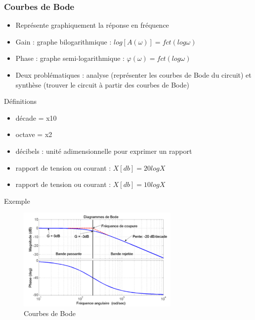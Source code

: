 \documentclass[a4paper]{article}
\begin{document}
        \subsubsection{Courbes de Bode}
            \begin{itemize}
                \item Représente graphiquement la réponse en fréquence
                \item Gain : graphe bilogarithmique : $ log[A(\omega)] = fct(log \omega) $
                \item Phase : graphe semi-logarithmique : $ \varphi(\omega) = fct(log \omega) $
                \item Deux problématiques : analyse (représenter les courbes de Bode du circuit) et synthèse (trouver le circuit à partir des courbes de Bode)
            \end{itemize}
            Définitions
            \begin{itemize}
                \item décade = x10
                \item octave = x2
                \item décibels : unité adimensionnelle pour exprimer un rapport
                \item rapport de tension ou courant : $ X[db] = 20logX $
                \item rapport de tension ou courant : $ X[db] = 10logX $
            \end{itemize}
            Exemple
            \begin{figure}[H]
                \begin{center}
                    \includegraphics[width=0.7\textwidth]{fig/2_courbesbode.png}
                    \caption{Courbes de Bode}
                    \label{fig:2_superposition}
                \end{center}
            \end{figure}
\end{document}
